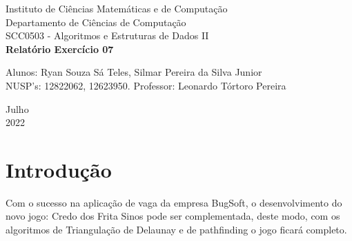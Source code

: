 \documentclass[a4paper, 12pt]{article}
\begin{document}

\begin{titlepage}
	\begin{center}
	

		\Huge{Instituto de Ciências Matemáticas e de Computação}\\
		\large{Departamento de Ciências de Computação}\\ 
		\large{SCC0503 - Algoritmos e Estruturas de Dados II}\\ 
		\vspace{15pt}
        \vspace{95pt}
        \textbf{\LARGE{Relatório Exercício 07}}\\
		\vspace{3,5cm}
	\end{center}
	
	\begin{flushleft}
		\begin{tabbing}
			Alunos: Ryan Souza Sá Teles, Silmar Pereira da Silva Junior \\
            NUSP's: 12822062, 12623950.
			Professor: Leonardo Tórtoro Pereira\\
	\end{tabbing}
 \end{flushleft}
	\vspace{1cm}
	
	\begin{center}
		\vspace{\fill}
			 Julho\\
		 2022
			\end{center}
\end{titlepage}

\newpage
\newpage
\tableofcontents
\thispagestyle{empty}

\newpage
{}
\section{Introdução}
Com o sucesso na aplicação de vaga da empresa BugSoft, o desenvolvimento do novo jogo: Credo dos Frita Sinos pode ser complementada, deste modo, com os algoritmos de Triangulação de Delaunay e de pathfinding o jogo ficará completo.
\end{document}

